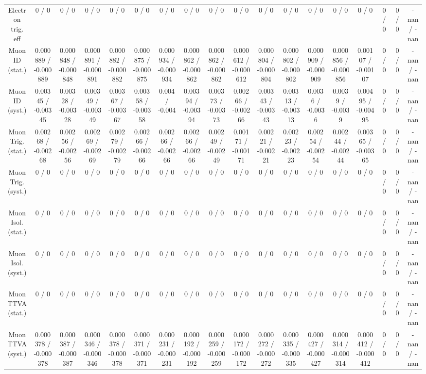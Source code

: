 \documentclass[10pt]{article}
\begin{document}
\begin{table}[htbp]
\begin{center}
\begin{tabular}{|c|c|c|c|c|c|c|c|c|c|c|c|c|c|c|c|c|c|}
  Electron trig. eff & 0 / 0 & 0 / 0 & 0 / 0 & 0 / 0 & 0 / 0 & 0 / 0 & 0 / 0 & 0 / 0 & 0 / 0 & 0 / 0 & 0 / 0 & 0 / 0 & 0 / 0 & 0 / 0 & 0 / 0 & 0 / 0 & -nan / -nan \\ 
  Muon ID (stat.) & 0.000889 / -0.000889 & 0.000848 / -0.000848 & 0.000891 / -0.000891 & 0.000882 / -0.000882 & 0.000875 / -0.000875 & 0.000934 / -0.000934 & 0.000862 / -0.000862 & 0.000862 / -0.000862 & 0.000612 / -0.000612 & 0.000804 / -0.000804 & 0.000802 / -0.000802 & 0.000909 / -0.000909 & 0.000856 / -0.000856 & 0.00107 / -0.00107 & 0 / 0 & 0 / 0 & -nan / -nan \\ 
  Muon ID (syst.) & 0.00345 / -0.00345 & 0.00328 / -0.00328 & 0.00349 / -0.00349 & 0.00367 / -0.00367 & 0.00358 / -0.00358 & 0.004 / -0.004 & 0.00394 / -0.00394 & 0.00373 / -0.00373 & 0.00266 / -0.00266 & 0.00343 / -0.00343 & 0.00313 / -0.00313 & 0.0036 / -0.0036 & 0.0039 / -0.0039 & 0.00495 / -0.00495 & 0 / 0 & 0 / 0 & -nan / -nan \\ 
  Muon Trig. (stat.) & 0.00268 / -0.00268 & 0.00256 / -0.00256 & 0.00269 / -0.00269 & 0.00279 / -0.00279 & 0.00266 / -0.00266 & 0.00266 / -0.00266 & 0.00266 / -0.00266 & 0.00249 / -0.00249 & 0.00171 / -0.00171 & 0.00221 / -0.00221 & 0.00223 / -0.00223 & 0.00254 / -0.00254 & 0.00244 / -0.00244 & 0.00365 / -0.00365 & 0 / 0 & 0 / 0 & -nan / -nan \\ 
  Muon Trig. (syst.) & 0 / 0 & 0 / 0 & 0 / 0 & 0 / 0 & 0 / 0 & 0 / 0 & 0 / 0 & 0 / 0 & 0 / 0 & 0 / 0 & 0 / 0 & 0 / 0 & 0 / 0 & 0 / 0 & 0 / 0 & 0 / 0 & -nan / -nan \\ 
  Muon Isol. (stat.) & 0 / 0 & 0 / 0 & 0 / 0 & 0 / 0 & 0 / 0 & 0 / 0 & 0 / 0 & 0 / 0 & 0 / 0 & 0 / 0 & 0 / 0 & 0 / 0 & 0 / 0 & 0 / 0 & 0 / 0 & 0 / 0 & -nan / -nan \\ 
  Muon Isol. (syst.) & 0 / 0 & 0 / 0 & 0 / 0 & 0 / 0 & 0 / 0 & 0 / 0 & 0 / 0 & 0 / 0 & 0 / 0 & 0 / 0 & 0 / 0 & 0 / 0 & 0 / 0 & 0 / 0 & 0 / 0 & 0 / 0 & -nan / -nan \\ 
  Muon TTVA (stat.) & 0 / 0 & 0 / 0 & 0 / 0 & 0 / 0 & 0 / 0 & 0 / 0 & 0 / 0 & 0 / 0 & 0 / 0 & 0 / 0 & 0 / 0 & 0 / 0 & 0 / 0 & 0 / 0 & 0 / 0 & 0 / 0 & -nan / -nan \\ 
  Muon TTVA (syst.) & 0.000378 / -0.000378 & 0.000387 / -0.000387 & 0.000346 / -0.000346 & 0.000378 / -0.000378 & 0.000371 / -0.000371 & 0.000231 / -0.000231 & 0.000192 / -0.000192 & 0.000259 / -0.000259 & 0.000172 / -0.000172 & 0.000272 / -0.000272 & 0.000335 / -0.000335 & 0.000427 / -0.000427 & 0.000314 / -0.000314 & 0.000412 / -0.000412 & 0 / 0 & 0 / 0 & -nan / -nan \\ 

\end{tabular}
\end{center}
\end{table}
\end{document}
